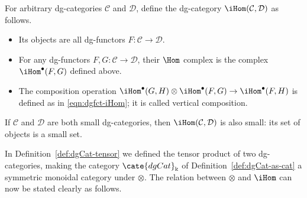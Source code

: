 \begin{definition}
	For arbitrary dg-categories $\mathcal{C}$ and $\mathcal{D}$, define the
	dg-category $\iHom(\mathcal{C},\mathcal{D})$ as follows.
	\begin{itemize}
		\item Its objects are all dg-functors $F:\mathcal{C}\to\mathcal{D}$.
		\item For any dg-functors $F,G:\mathcal{C}\to\mathcal{D}$, their
		$\Hom$ complex is the complex $\iHom^\bullet(F,G)$ defined above.
		\item The composition operation
		$\iHom^\bullet(G,H)\otimes\iHom^\bullet(F,G)\to
		\iHom^\bullet(F,H)$ is defined as in \eqref{eqn:dgfct-iHom}; it is
		called vertical composition.
	\end{itemize}
\end{definition}

If $\mathcal{C}$ and $\mathcal{D}$ are both small dg-categories, then
$\iHom(\mathcal{C},\mathcal{D})$ is also small: its set of objects is a small
set.

In Definition~\ref{def:dgCat-tensor} we defined the tensor product of two
dg-categories, making the category $\cate{dgCat}_{\Bbbk}$ of
Definition~\ref{def:dgCat-as-cat} a symmetric monoidal category under
$\otimes$. The relation between $\otimes$ and $\iHom$ can now be stated
clearly as follows.

